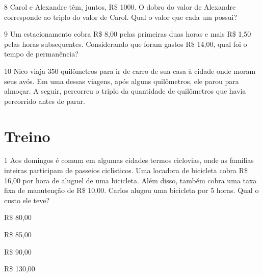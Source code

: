 \pagebreak
\num{8} Carol e Alexandre têm, juntos, R\$ 1000. O dobro do
valor de Alexandre corresponde ao triplo do valor de Carol. Qual o valor
que cada um possui?

\begin{emptybox}

\end{emptybox}

\num{9} Um estacionamento cobra R\$ 8,00 pelas primeiras duas horas e mais
R\$ 1,50 pelas horas subsequentes. Considerando que foram gastos R\$
14,00, qual foi o tempo de permanência?

\begin{emptybox}

\end{emptybox}

\num{10} Nico viaja 350 quilômetros para ir de carro de sua casa à cidade
onde moram seus avós. Em uma dessas viagens, após alguns quilômetros,
ele parou para almoçar. A seguir, percorreu o triplo da quantidade de
quilômetros que havia percorrido antes de parar.

\begin{emptybox}
\end{emptybox}

\section{Treino}

\num{1} Aos domingos é comum em algumas cidades termos ciclovias, onde as
famílias inteiras participam de passeios ciclísticos. Uma locadora de bicicleta
cobra R\$ 16,00 por hora de aluguel de uma bicicleta. Além disso,
também cobra uma taxa fixa de manutenção de R\$ 10,00. Carlos alugou uma
bicicleta por 5 horas. Qual o custo ele teve?

\begin{escolha}

  \item R\$ 80,00

  \item R\$ 85,00

  \item R\$ 90,00

  \item R\$ 130,00

\end{escolha}



